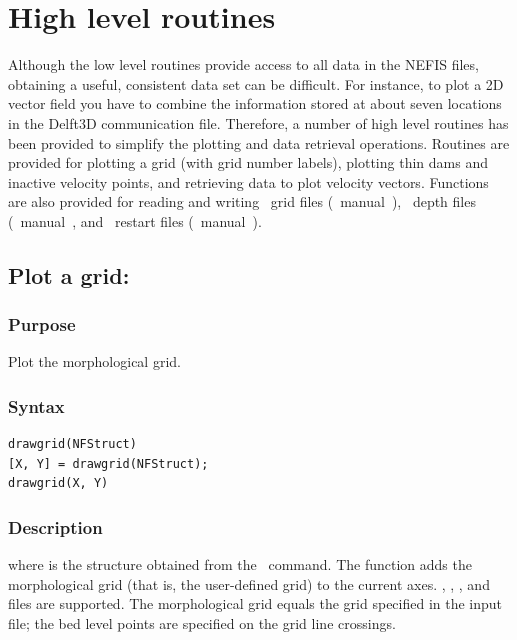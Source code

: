 
\chapter{High level routines} \label{Chp:HighLevelRoutines}
Although the low level routines provide access to all data in the NEFIS files, obtaining a useful, consistent data set can be difficult.
For instance, to plot a 2D vector field you have to combine the information stored at about seven locations in the Delft3D communication file.
Therefore, a number of high level routines has been provided to simplify the plotting and data retrieval operations.
Routines are provided for plotting a grid (with grid number labels), plotting thin dams and inactive velocity points, and retrieving data to plot velocity vectors.
Functions are also provided for reading and writing \DRGFGRID\  grid files (\DRGFGRID\  manual~\citep{RGF_UM}), \DQUICKIN\ depth files (\DQUICKIN\ manual~\citep{QUICKIN_UM}, and \DFLOW\ restart files (\DFLOW\ manual~\citep{FLOW_UM}).

\section{Plot a grid: }

\subsection*{Purpose}
Plot the morphological grid.

\subsection*{Syntax}
\begin{Verbatim}
drawgrid(NFStruct)
[X, Y] = drawgrid(NFStruct);
drawgrid(X, Y)
\end{Verbatim}

\subsection*{Description}
 where  is the structure obtained from the \vsuse\ command.
The function adds the morphological grid (that is, the user-defined grid) to the current axes.
, , , and  files are supported.
The morphological grid equals the grid specified in the input file; the bed level points are specified on the grid line crossings.

